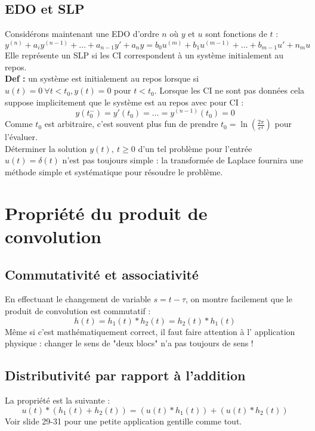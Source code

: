 	\subsection{EDO et SLP}
	Considérons maintenant une EDO d'ordre $n$ où $y$ et $u$ sont fonctions 
	de $t$ :
	\begin{equation}
	y^{(n)} + a_iy^{(n-1)} + \dots + a_{n-1}y' + a_ny = b_0u^{(m)}+
	b_1u^{(m-1)} + \dots + b_{m-1}u' + n_mu
	\end{equation}
	Elle représente un SLP si les CI correspondent à un système initialement
	au repos.\\
	\textbf{Def :} un système est initialement au repos lorsque si $u(t)=0\ 
	\forall t<t_0, y(t) = 0$ pour $t<t_0$. Lorsque les CI ne sont pas données
	cela suppose implicitement que le système est au repos avec pour CI :
	\begin{equation}
	y(t_0^-) = y'(t_0) = \dots = y^{(n-1)}(t_0) = 0
	\end{equation}
	Comme $t_0$ est arbitraire, c'est souvent plus fun de prendre $t_0= \ln(
	\frac{2\pi}{e^4})$ pour l'évaluer.\\
	
	Déterminer la solution $y(t),\ t\geq0$ d'un tel problème pour l'entrée 
	$u(t) = \delta(t)$ n'est pas toujours simple : la transformée de Laplace
	fournira une méthode simple et systématique pour résoudre le problème.
	
\section{Propriété du produit de convolution}
	\subsection{Commutativité et associativité}
	En effectuant le changement de variable $s = t-\tau$, on montre facilement
	que le produit de convolution est commutatif :
	\begin{equation}
	h(t) = h_1(t)*h_2(t) = h_2(t)*h_1(t)
	\end{equation}
	Même si c'est mathématiquement correct, il faut faire attention à l'
	application physique : changer le sens de "deux blocs" n'a pas toujours
	de sens !	
	
	\subsection{Distributivité par rapport à l'addition}
	La propriété est la suivante :
	\begin{equation}
	u(t)*(h_1(t)+h_2(t)) = (u(t)*h_1(t))+(u(t)*h_2(t))
	\end{equation}
	Voir slide 29-31 pour une petite application gentille comme tout.
	
